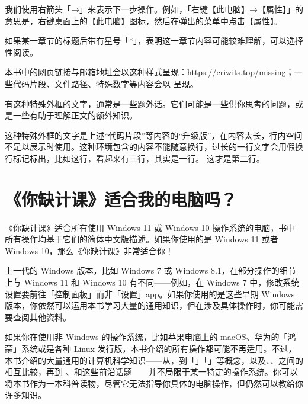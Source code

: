 
我们使用右箭头「→」来表示下一步操作。例如，「右键【此电脑】→【属性】」的意思是，右键桌面上的【此电脑】图标，然后在弹出的菜单中点击【属性】。

如果某一章节的标题后带有星号「*」，表明这一章节内容可能较难理解，可以选择性阅读。

本书中的网页链接与邮箱地址会以这种样式呈现：\url{https://criwits.top/missing}；一些代码片段、文件路径、特殊数字等内容会以  呈现。

\begin{note}
  有这种特殊外框的文字，通常是一些题外话。它们可能是一些供你思考的问题，或是一些有助于理解正文的额外知识。
\end{note}

\begin{MissingVerbatim}
这种特殊外框的文字是上述“代码片段”等内容的“升级版”，在内容太长，行内空间不足以展示时使用。这种环境包含的内容不能随意换行，过长的一行文字会用假换行标记标出，比如这行，看起来有三行，其实是一行。
这才是第二行。
\end{MissingVerbatim}

\section{《你缺计课》适合我的电脑吗？}

《你缺计课》适合所有使用 Windows 11 或 Windows 10 操作系统的电脑，书中所有操作均基于它们的简体中文版描述。如果你使用的是 Windows 11 或者 Windows 10，那么《你缺计课》非常适合你！

上一代的 Windows 版本，比如 Windows 7 或 Windows 8.1，在部分操作的细节上与 Windows 11 和 Windows 10 有不同——例如，在 Windows 7 中，修改系统设置要前往「控制面板」而非「设置」app。如果你使用的是这些早期 Windows 版本，你依然可以运用本书学习大量的通用知识，但在涉及具体操作时，你可能需要查阅其他资料。

如果你在使用非 Windows 的操作系统，比如苹果电脑上的 macOS、华为的「鸿蒙」系统或是各种 Linux 发行版，本书介绍的所有操作都可能不再适用。不过，本书介绍的大量通用的计算机科学知识——从\hyperref[cha:computer-and-its-components]{}，到「\hyperref[cha:file-and-file-management]{}」「\hyperref[cha:archive-formats-and-tools]{}」等概念，以及\hyperref[cha:browsers-and-how-to-choose]{}、\hyperref[cha:mail-and-instant-messaging]{}、\hyperref[cha:office-and-wps]{}之间的相互比较，再到 \hyperref[cha:bring-intelligence-to-machines]{}、\hyperref[cha:introduction-to-cryptology]{}和\hyperref[cha:cloud-computing-and-iot]{}这些前沿话题——并不局限于某一特定的操作系统。你可以将本书作为一本科普读物，尽管它无法指导你具体的电脑操作，但仍然可以教给你许多知识。

